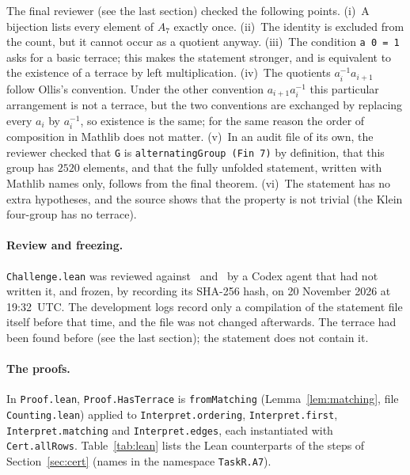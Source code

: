 \documentclass[11pt]{article}
\theoremstyle{definition}
\theoremstyle{remark}
\newcommand{\Alt}{A_7}
\begin{document}
{The final reviewer (see the last section) checked the following points.
(i)~A bijection lists every element of $\Alt$ exactly once. (ii)~The identity
is excluded from the count, but it cannot occur as a quotient anyway.
(iii)~The condition \texttt{a 0 = 1} asks for a basic terrace; this makes the
statement stronger, and is equivalent to the existence of a terrace by left
multiplication. (iv)~The quotients $a_i^{-1}a_{i+1}$ follow Ollis's
convention. Under the other convention $a_{i+1}a_i^{-1}$ this particular
arrangement is not a terrace, but the two conventions are exchanged by
replacing every $a_i$ by $a_i^{-1}$, so existence is the same; for the same
reason the order of composition in Mathlib does not matter. (v)~In an audit
file of its own, the reviewer checked that \texttt{G} is
\texttt{alternatingGroup (Fin 7)} by definition, that this group has $2520$
elements, and that the fully unfolded statement, written with Mathlib names
only, follows from the final theorem. (vi)~The statement has no extra
hypotheses, and the source shows that the property is not trivial (the Klein
four-group has no terrace).

\paragraph{Review and freezing.}
\texttt{Challenge.lean} was reviewed against~\cite{ollis16} and~\cite{survey}
by a Codex agent that had not written it, and frozen, by recording its
SHA-256 hash, on 20 November 2026 at 19:32~UTC. The development logs record
only a compilation of the statement file itself before that time, and the
file was not changed afterwards. The terrace had been found before (see the
last section); the statement does not contain it.

\paragraph{The proofs.}
In \texttt{Proof.lean}, \texttt{Proof.HasTerrace} is \texttt{fromMatching}
(Lemma~\ref{lem:matching}, file \texttt{Counting.lean}) applied to
\texttt{Interpret.ordering}, \texttt{Interpret.first},
\texttt{Interpret.matching} and \texttt{Interpret.edges}, each instantiated
with \texttt{Cert.allRows}. Table~\ref{tab:lean} lists the Lean counterparts
of the steps of Section~\ref{sec:cert} (names in the namespace
\texttt{TaskR.A7}).

}
\end{document}
